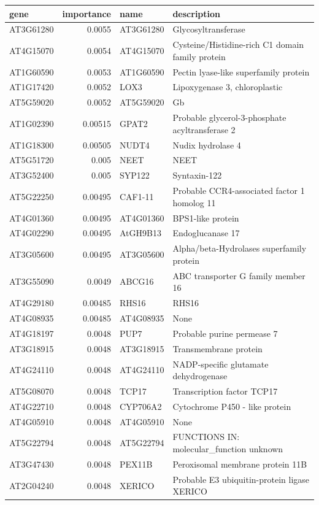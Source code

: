 \documentclass[11pt]{article}
\begin{document}
\begin{center}
\begin{tabular}{lrll}
gene & importance & name & description\\
\hline
AT3G61280 & 0.0055 & AT3G61280 & Glycosyltransferase\\
AT4G15070 & 0.0054 & AT4G15070 & Cysteine/Histidine-rich C1 domain family protein\\
AT1G60590 & 0.0053 & AT1G60590 & Pectin lyase-like superfamily protein\\
AT1G17420 & 0.0052 & LOX3 & Lipoxygenase 3, chloroplastic\\
AT5G59020 & 0.0052 & AT5G59020 & Gb\\
AT1G02390 & 0.00515 & GPAT2 & Probable glycerol-3-phosphate acyltransferase 2\\
AT1G18300 & 0.00505 & NUDT4 & Nudix hydrolase 4\\
AT5G51720 & 0.005 & NEET & NEET\\
AT3G52400 & 0.005 & SYP122 & Syntaxin-122\\
AT5G22250 & 0.00495 & CAF1-11 & Probable CCR4-associated factor 1 homolog 11\\
AT4G01360 & 0.00495 & AT4G01360 & BPS1-like protein\\
AT4G02290 & 0.00495 & AtGH9B13 & Endoglucanase 17\\
AT3G05600 & 0.00495 & AT3G05600 & Alpha/beta-Hydrolases superfamily protein\\
AT3G55090 & 0.0049 & ABCG16 & ABC transporter G family member 16\\
AT4G29180 & 0.00485 & RHS16 & RHS16\\
AT4G08935 & 0.00485 & AT4G08935 & None\\
AT4G18197 & 0.0048 & PUP7 & Probable purine permease 7\\
AT3G18915 & 0.0048 & AT3G18915 & Transmembrane protein\\
AT4G24110 & 0.0048 & AT4G24110 & NADP-specific glutamate dehydrogenase\\
AT5G08070 & 0.0048 & TCP17 & Transcription factor TCP17\\
AT4G22710 & 0.0048 & CYP706A2 & Cytochrome P450 - like protein\\
AT4G05910 & 0.0048 & AT4G05910 & None\\
AT5G22794 & 0.0048 & AT5G22794 & FUNCTIONS IN: molecular\_function unknown\\
AT3G47430 & 0.0048 & PEX11B & Peroxisomal membrane protein 11B\\
AT2G04240 & 0.0048 & XERICO & Probable E3 ubiquitin-protein ligase XERICO\\

\end{tabular}
\end{center}
\end{document}
